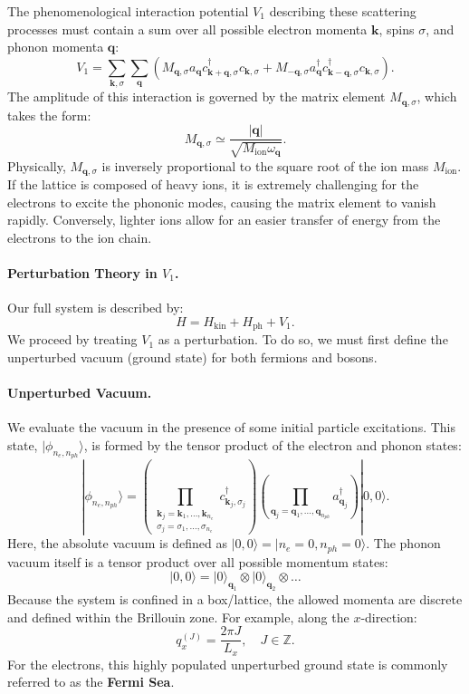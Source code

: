 The phenomenological interaction potential \(V_1\) describing these scattering processes must contain a sum over all possible electron momenta \(\mathbf{k}\), spins \(\sigma\), and phonon momenta \(\mathbf{q}\):
\[
    V_1 = \sum_{\mathbf{k}, \sigma} \sum_{\mathbf{q}} \left( M_{\mathbf{q}, \sigma} a_{\mathbf{q}} c_{\mathbf{k} + \mathbf{q}, \sigma}^\dagger c_{\mathbf{k}, \sigma} + M_{-\mathbf{q}, \sigma} a_{\mathbf{q}}^\dagger c_{\mathbf{k} - \mathbf{q}, \sigma}^\dagger c_{\mathbf{k}, \sigma} \right).
\]
The amplitude of this interaction is governed by the matrix element \(M_{\mathbf{q}, \sigma}\), which takes the form:
\[
    M_{\mathbf{q}, \sigma} \simeq \frac{|\mathbf{q}|}{\sqrt{M_{\text{ion}} \omega_{\mathbf{q}}}}.
\]
Physically, \(M_{\mathbf{q}, \sigma}\) is inversely proportional to the square root of the ion mass \(M_{\text{ion}}\). If the lattice is composed of heavy ions, it is extremely challenging for the electrons to excite the phononic modes, causing the matrix element to vanish rapidly. Conversely, lighter ions allow for an easier transfer of energy from the electrons to the ion chain.

\paragraph{Perturbation Theory in $V_1$.} Our full system is described by:
\[
    H = H_{\text{kin}} + H_{\text{ph}} + V_1.
\]
We proceed by treating \(V_1\) as a perturbation. To do so, we must first define the unperturbed vacuum (ground state) for both fermions and bosons.

\paragraph{Unperturbed Vacuum.} We evaluate the vacuum in the presence of some initial particle excitations. This state, \(|\phi_{n_e, n_{ph}}\rangle\), is formed by the tensor product of the electron and phonon states:
\[
    |\phi_{n_e, n_{ph}}\rangle = \left( \prod_{\substack{\mathbf{k}_j = \mathbf{k}_1, \dots, \mathbf{k}_{n_e} \\ \sigma_j = \sigma_1, \dots, \sigma_{n_e}}} c_{\mathbf{k}_j, \sigma_j}^\dagger \right) \left( \prod_{\mathbf{q}_j = \mathbf{q}_1, \dots, \mathbf{q}_{n_{ph}}} a_{\mathbf{q}_j}^\dagger \right) |0, 0\rangle.
\]
Here, the absolute vacuum is defined as \(|0, 0\rangle = |n_e = 0, n_{ph} = 0\rangle\). The phonon vacuum itself is a tensor product over all possible momentum states:
\[
    |0, 0\rangle = |0\rangle_{\mathbf{q}_1} \otimes |0\rangle_{\mathbf{q}_2} \otimes \dots
\]
Because the system is confined in a box/lattice, the allowed momenta are discrete and defined within the Brillouin zone. For example, along the \(x\)-direction:
\[
    q_x^{(J)} = \frac{2\pi J}{L_x}, \quad J \in \mathbb{Z}.
\]
For the electrons, this highly populated unperturbed ground state is commonly referred to as the \textbf{Fermi Sea}.

